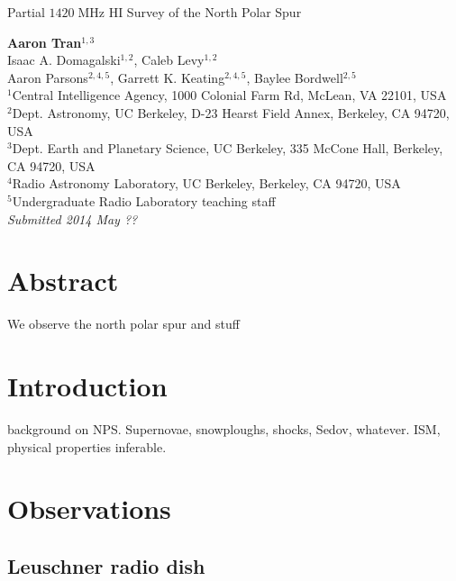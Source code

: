 \documentclass[10pt]{article}
\newcommand {\mt}{\mathrm}
\newcommand {\unit}[1]{\; \mt{#1}}
\begin{document}
\begin{center}
\Large{Partial $1420\unit{MHz}$ HI Survey of the North Polar Spur}

\normalsize
\textbf{Aaron Tran}${}^{1,3}$ \\
Isaac A. Domagalski${}^{1,2}$, Caleb Levy${}^{1,2}$ \\
Aaron Parsons${}^{2,4,5}$, Garrett K. Keating${}^{2,4,5}$, Baylee Bordwell${}^{2,5}$ \\
\footnotesize
${}^1$Central Intelligence Agency, 1000 Colonial Farm Rd, McLean, VA 22101, USA \\
${}^2$Dept. Astronomy, UC Berkeley, D-23 Hearst Field Annex, Berkeley, CA 94720, USA \\
${}^3$Dept. Earth and Planetary Science, UC Berkeley, 335 McCone Hall, Berkeley, CA 94720, USA \\
${}^4$Radio Astronomy Laboratory, UC Berkeley, Berkeley, CA 94720, USA \\
${}^5$Undergraduate Radio Laboratory teaching staff \\
\textit{Submitted 2014 May ??}
\end{center}

\section*{Abstract}

We observe the north polar spur and stuff

\section{Introduction}

background on NPS.  Supernovae, snowploughs, shocks, Sedov, whatever.
ISM, physical properties inferable.

\section{Observations}

\subsection{Leuschner radio dish}
\end{document}
